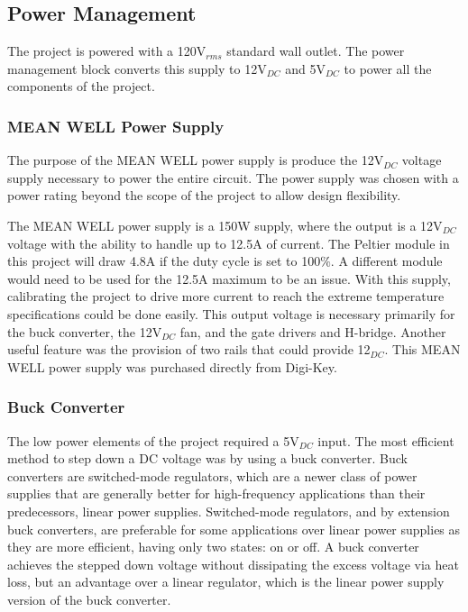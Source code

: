 \documentclass[11pt,letter]{article}
\begin{document}
\subsection{Power Management}

The project is powered with a 120V$_{rms}$ standard wall outlet. The power management block converts this supply to 12V$_{DC}$ and 5V$_{DC}$ to power all the components of the project.

\subsubsection{MEAN WELL Power Supply}

The purpose of the MEAN WELL power supply is produce the 12V$_{DC}$ voltage supply necessary to power the entire circuit. The power supply was chosen with a power rating beyond the scope of the project to allow design flexibility.

The MEAN WELL power supply is a 150W supply, where the output is a 12V$_{DC}$ voltage with the ability to handle up to 12.5A of current. The Peltier module in this project will draw 4.8A if the duty cycle is set to 100$\%$. A different module would need to be used for the 12.5A maximum to be an issue. With this supply, calibrating the project to drive more current to reach the extreme temperature specifications could be done easily. This output voltage is necessary primarily for the buck converter, the 12V$_{DC}$ fan, and the gate drivers and H-bridge. Another useful feature was the provision of two rails that could provide 12$_{DC}$. This MEAN WELL power supply was purchased directly from Digi-Key.

\subsubsection{Buck Converter}

The low power elements of the project required a 5V$_{DC}$ input. The most efficient method to step down a DC voltage was by using a buck converter. Buck converters are switched-mode regulators, which are a newer class of power supplies that are generally better for high-frequency applications than their predecessors, linear power supplies. Switched-mode regulators, and by extension buck converters, are preferable for some applications over linear power supplies as they are more efficient, having only two states: on or off. A buck converter achieves the stepped down voltage without dissipating the excess voltage via heat loss, but an advantage over a linear regulator, which is the linear power supply version of the buck converter. 
\end{document}

